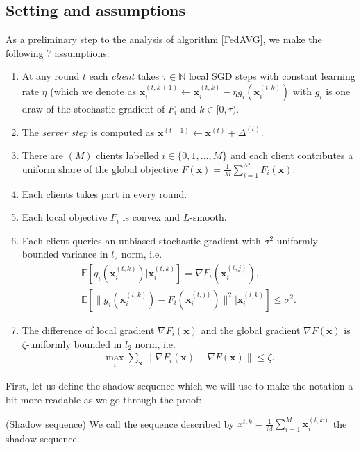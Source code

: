 \subsection{Setting and assumptions}
\label{assumptions}
As a preliminary step to the analysis of algorithm \ref{FedAVG}, we make the following 7 assumptions:

\begin{enumerate}
    \item At any round $t$ each \textit{client} takes $\tau \in \mathbb{N}$ local SGD steps with constant learning rate $\eta$ (which we denote as $\bm{x}_i^{(t,k+1)} \leftarrow \bm{x}_i^{(t,k)} - \eta g_i(\bm{x}_i^{(t,k)})$ with $g_i$ is one draw of the stochastic gradient of $F_i$ and $k \in [0,\tau)$.
    \item The \textit{server step} is computed as $\bm{x}^{(t+1)} \leftarrow \bm{x}^{(t)} + \Delta^{(t)}$.
    \item There are $(M)$ clients labelled $i \in \{0,1,...,M\}$ and each client contributes a uniform share of the global objective $F(\bm{x}) = \frac{1}{M} \sum^{M}_{i=1} F_i(\bm{x})$.
    \item Each clients takes part in every round.
    \item Each local objective $F_i$ is convex and $L$-smooth.
    \item Each client queries an unbiased stochastic gradient with $\sigma^2$-uniformly bounded variance in $l_2$ norm, i.e.
    \begin{align}
        \mathbb{E}[g_i(\bm{x}^{(t,k)}_i) | \bm{x}^{(t,k)}_i] = \nabla F_i(\bm{x}_i^{(t,j)}), \\
        \mathbb{E}[\| g_i(\bm{x}^{(t,k)}_i) -  F_i(\bm{x}_i^{(t,j)}) \|^2 | \bm{x}_i^{(t,k)} ] \leq \sigma^2.
    \end{align}
    \item The difference of local gradient $\nabla F_i(\bm{x})$ and the global gradient $\nabla F(\bm{x})$ is $\zeta$-uniformly bounded in $l_2$ norm, i.e.
    \begin{align}
        \max_i \sum_{\bm{x}} \| \nabla F_i(\bm{x}) - \nabla F(\bm{x}) \| \leq \zeta.
    \end{align}
\end{enumerate}

First, let us define the shadow sequence which we will use to make the notation a bit more readable as we go through the proof:

\begin{notation}
    (Shadow sequence) We call the sequence described by $\bar{x}^{t,k} = \frac{1}{M} \sum_{i=1}^{M} \bm{x}_i^{(t,k)}$ the shadow sequence.
\end{notation}

